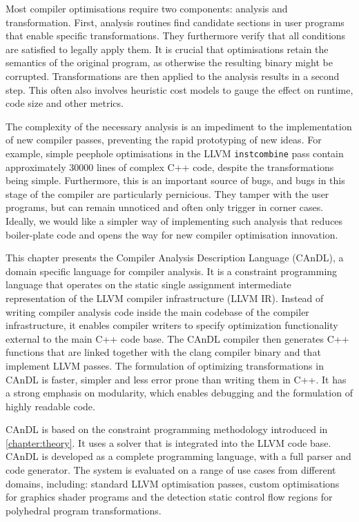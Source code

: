     Most compiler optimisations require two components:
    analysis and transformation.
    First, analysis routines find candidate sections in user programs that
    enable specific transformations.
    They furthermore verify that all conditions are satisfied to legally apply
    them.
    It is crucial that optimisations retain the semantics of the original
    program, as otherwise the resulting binary might be corrupted.
    Transformations are then applied to the analysis results in a second step.
    This often also involves heuristic cost models to gauge the effect on
    runtime, code size and other metrics.

    The complexity of the necessary analysis is an impediment to
    the implementation of new compiler passes, preventing the rapid
    prototyping of new ideas.
    For example, simple peephole optimisations in the LLVM {\tt instcombine}
    pass contain approximately 30000 lines of complex C++ code, despite the
    transformations being simple.
    Furthermore, this is an important source of bugs, and bugs in this stage of
    the compiler are particularly pernicious.
    They tamper with the user programs, but can remain unnoticed and often only
    trigger in corner cases.
    Ideally, we would like a simpler way of implementing such analysis that
    reduces boiler-plate code and opens the way for new compiler optimisation
    innovation.

    This chapter presents the Compiler Analysis Description Language (CAnDL), a
    domain specific language for compiler analysis.
    It is a constraint programming language that operates on the static single
    assignment intermediate representation of the LLVM compiler infrastructure
    (LLVM IR).
    Instead of writing compiler analysis code inside the main codebase of the
    compiler infrastructure, it enables compiler writers to specify optimization
    functionality external to the main C++ code base.
    The CAnDL compiler then generates C++ functions that are linked together
    with the clang compiler binary and that implement LLVM passes.
    The formulation of optimizing transformations in CAnDL is faster, simpler
    and less error prone than writing them in C++.
    It has a strong emphasis on modularity, which enables debugging and the
    formulation of highly readable code.

    CAnDL is based on the constraint programming methodology introduced in
    \autoref{chapter:theory}.
    It uses a solver that is integrated into the LLVM code base.
    CAnDL is developed as a complete programming language, with a full parser
    and code generator.
    The system is evaluated on a range of use cases from
    different domains, including: standard LLVM optimisation passes,
    custom optimisations for graphics shader programs and the detection static
    control flow regions for polyhedral program transformations.

